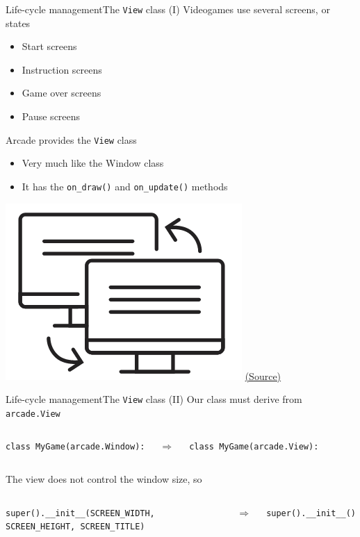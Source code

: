 \documentclass[10pt,compress]{beamer} %
\begin{document}
\begin{frame}{Life-cycle management}{The \texttt{View} class (I)}
	Videogames use several screens, or states
	\begin{itemize}
    		\item Start screens
    		\item Instruction screens
    		\item Game over screens
    		\item Pause screens
	\end{itemize}

	Arcade provides the \texttt{View} class
	\begin{itemize}
		\item Very much like the Window class
		\item It has the \texttt{on\_draw()} and \texttt{on\_update()} methods
	\end{itemize}


	\vspace{-3.5cm}
    \hfill \includegraphics[width=0.3\linewidth]{figs/screens.png}
	\tiny  \href{https://api.arcade.academy/en/stable/tutorials/views/index.html}{(Source)}
\end{frame}

\begin{frame}{Life-cycle management}{The \texttt{View} class (II)}
	Our class must derive from \texttt{arcade.View}
	\begin{columns}
		\begin{exampleblock}{}
		\lstinline{class MyGame(arcade.Window):}
		\end{exampleblock}
		$\Rightarrow$
		\begin{exampleblock}{}
		\lstinline{class MyGame(arcade.View):}
		\end{exampleblock}
	\end{columns}

	\bigskip

	The view does not control the window size, so
	\begin{columns}
 	   \column{.4\textwidth}
		\begin{exampleblock}{}
		\lstinline{super().__init__(SCREEN_WIDTH, SCREEN_HEIGHT, SCREEN_TITLE)}
		\end{exampleblock}
 	   \column{.1\textwidth}
		$\Rightarrow$
 	   \column{.3\textwidth}
		\begin{exampleblock}{}
		\lstinline{super().__init__()}
		\end{exampleblock}
 	   \column{.1\textwidth}
	\end{columns}
\end{frame}
\end{document}
